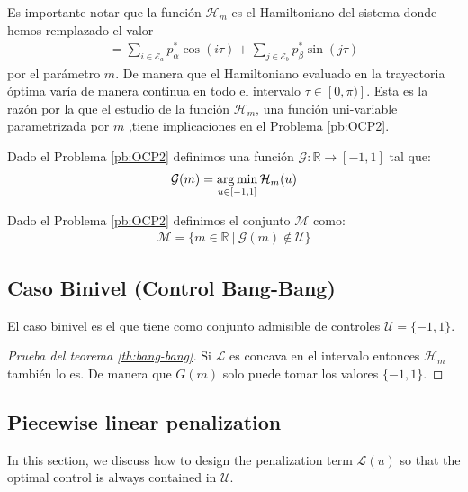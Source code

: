Es importante notar que la función $\mathcal{H}_m$ es el Hamiltoniano del sistema donde hemos remplazado el valor 
\begin{gather}
	[\bm{p}^* \cdot \bm{\mathcal{D}}(\tau)] = \sum_{i \in \mathcal{E}_a} p^*_\alpha \cos(i\tau) + \sum_{j \in \mathcal{E}_b} p^*_\beta \sin(j\tau) 
\end{gather}
por el parámetro $m$. De manera que el Hamiltoniano evaluado en la trayectoria óptima varía de manera continua en todo el intervalo $\tau \in [0,\pi)]$. 
%
Esta es la razón por la que el estudio de la función $\mathcal{H}_m$, una función uni-variable parametrizada por $m$ ,tiene implicaciones en el Problema \ref{pb:OCP2}.
\newline

\begin{definition}
    Dado el Problema \ref{pb:OCP2}  definimos una función $\mathcal{G}:\mathbb{R} \rightarrow [-1,1]$ tal que:
    \begin{gather}
        \mathcal{G}(m) = \operatorname*{arg\,min}_{u \in [-1,1]} \mathcal{H}_m(u)
    \end{gather}
\end{definition}
\begin{definition}
    Dado el Problema \ref{pb:OCP2} definimos el conjunto $\mathcal{M}$ como:
    \begin{gather}
        \mathcal{M} = \{m \in \mathbb{R}\ | \ \mathcal{G}(m) \notin \mathcal{U} \}
    \end{gather}
\end{definition}
\subsection{Caso Binivel (Control Bang-Bang)}
El caso binivel es el que tiene como conjunto admisible de controles $\mathcal{U}= \{-1,1\}$.
\vspace{1em}

\begin{proof}[Prueba del teorema \ref{th:bang-bang}]
    Si $\mathcal{L}$ es concava en el intervalo entonces $\mathcal{H}_m$ también lo es. De manera que $G(m)$ solo puede tomar los valores $\{-1,1\}$.
\end{proof}

\subsection{Piecewise linear penalization}

In this section, we discuss how to design the penalization term $\mathcal{L}(u)$ so that the optimal control is always contained in $\mathcal{U}$. 

